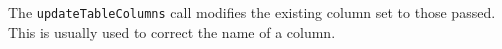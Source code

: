 The \verb+updateTableColumns+ call modifies the existing column set to those passed. This is usually used to correct the name
of a column.
